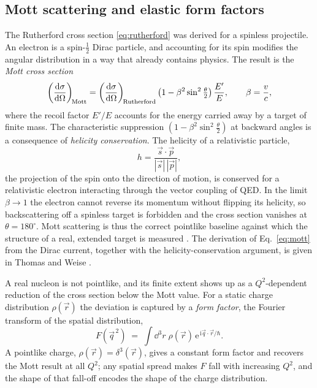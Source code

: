 \FloatBarrier

\subsection{Mott scattering and elastic form factors}
\label{subsec:form-factors}

The Rutherford cross section \eqref{eq:rutherford} was derived for a spinless
projectile. An electron is a spin-$\tfrac{1}{2}$ Dirac particle, and accounting for its
spin modifies the angular distribution in a way that already contains physics. The
result is the \emph{Mott cross section}
\begin{equation}
    \left(\dv{\sigma}{\Omega}\right)_{\!\mathrm{Mott}}
    = \left(\dv{\sigma}{\Omega}\right)_{\!\mathrm{Rutherford}}
      \left(1 - \beta^{2}\sin^{2}\tfrac{\theta}{2}\right)\frac{E'}{E},
    \qquad \beta = \frac{v}{c},
    \label{eq:mott}
\end{equation}
where the recoil factor $E'/E$ accounts for the energy carried away by a target of
finite mass. The characteristic suppression
$\left(1-\beta^{2}\sin^{2}\tfrac{\theta}{2}\right)$
at backward angles is a consequence of \emph{helicity conservation}. The helicity of a
relativistic particle,
\begin{equation}
    h = \frac{\vec s\cdot\vec p}{|\vec s|\,|\vec p|},
\end{equation}
the projection of the spin onto the direction of motion, is conserved for a
relativistic electron interacting through the vector coupling of QED. In the limit
$\beta\to 1$ the electron cannot reverse its momentum without flipping its helicity, so
backscattering off a spinless target is forbidden and the cross section vanishes at
$\theta=180^{\circ}$. Mott scattering is thus the correct pointlike baseline against
which the structure of a real, extended target is measured \cite[Ch.~1]{Amsler2018}.
The derivation of Eq.~\eqref{eq:mott} from the Dirac current, together with the
helicity-conservation argument, is given in Thomas and Weise
\cite[Ch.~2.1]{ThomasWeise2001}.

A real nucleon is not pointlike, and its finite extent shows up as a $Q^{2}$-dependent
reduction of the cross section below the Mott value. For a static charge distribution
$\rho(\vec r)$ the deviation is captured by a \emph{form factor}, the Fourier transform
of the spatial distribution,
\begin{equation}
    F(\vec q^{\,2}) \;=\; \int \dd^{3}r\;\rho(\vec r)\,
    \mathrm{e}^{\,\mathrm{i}\vec q\cdot\vec r/\hbar}.
    \label{eq:form-factor-def}
\end{equation}
A pointlike charge, $\rho(\vec r)=\delta^{3}(\vec r)$, gives a constant form factor and
recovers the Mott result at all $Q^{2}$; any spatial spread makes $F$ fall with
increasing $Q^{2}$, and the shape of that fall-off encodes the shape of the charge
distribution.

